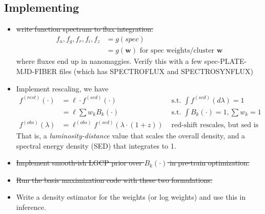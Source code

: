 \documentclass[11pt]{article}
\begin{document}
\subsection{Implementing}
\begin{itemize} \itemsep 0pt
\item \sout{write function spectrum to flux integration:}
  \begin{align}
    f_u, f_g, f_r, f_i, f_z 
      &= g(spec) \\
      &= g(\mathbf{w}) \text{ for spec weights/cluster } \mathbf{w}
  \end{align}
  where fluxes end up in nanomaggies.  Verify this with a few spec-PLATE-MJD-FIBER files (which has SPECTROFLUX and SPECTROSYNFLUX)
  
\item Implement rescaling, we have 
  \begin{align}
    f^{(rest)}(\cdot) 
      &= \ell \cdot f^{(sed)}(\cdot) & \text{ s.t. } \int f^{(sed)}(d\lambda) = 1 \\
      &= \ell \sum w_k B_k(\cdot)  & \text{ s.t. } \int B_k(\cdot) = 1, \sum w_k = 1 \\
    f^{(obs)}(\lambda) &= \ell^{(obs)} f^{(sed)}(\lambda \cdot( 1 + z)) & \text{ red-shift rescales, but sed is invariant }
  \end{align}
  That is, a \emph{luminosity-distance} value that scales the overall density, and a spectral energy density (SED) that integrates to 1.    

\item \sout{Implement smooth-ish LGCP prior over $B_k(\cdot)$ in pre-train optimization.}

\item \sout{Run the basis maximization code with these two formulations.}

\item Write a density estimator for the weights (or log weights) and use this in inference.  

\end{itemize}
\end{document}
